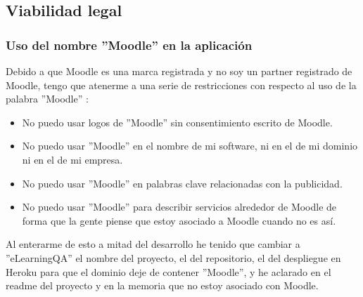 \subsection{Viabilidad legal}
\subsubsection{Uso del nombre ''Moodle'' en la aplicación}
Debido a que Moodle es una marca registrada y no soy un partner registrado de Moodle, tengo que atenerme a una serie de restricciones con respecto al uso de la palabra ''Moodle'' \cite{moodletrademark-2022}:
\begin{itemize}
	\item No puedo usar logos de ''Moodle'' sin consentimiento escrito de Moodle.
	\item No puedo usar ''Moodle'' en el nombre de mi software, ni en el de mi dominio ni en el de mi empresa.
	\item No puedo usar ''Moodle'' en palabras clave relacionadas con la publicidad.
	\item No puedo usar ''Moodle'' para describir servicios alrededor de Moodle de forma que la gente piense que estoy asociado a Moodle cuando no es así.
\end{itemize}

Al enterarme de esto a mitad del desarrollo he tenido que cambiar a ''eLearningQA'' el nombre del proyecto, el del repositorio, el del despliegue en Heroku para que el dominio deje de contener ''Moodle'', y he aclarado en el readme del proyecto y en la memoria que no estoy asociado con Moodle.
